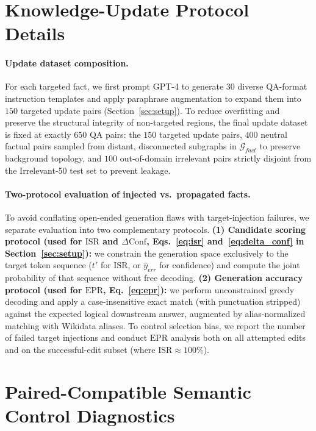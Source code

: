 \section{Knowledge-Update Protocol Details}
\label{app:update_protocol}

\paragraph{Update dataset composition.}
For each targeted fact, we first prompt GPT-4 to generate $30$ diverse QA-format instruction templates and apply paraphrase augmentation to expand them into $150$ targeted update pairs (Section~\ref{sec:setup}). To reduce overfitting and preserve the structural integrity of non-targeted regions, the final update dataset is fixed at exactly $650$ QA pairs: the $150$ targeted update pairs, $400$ neutral factual pairs sampled from distant, disconnected subgraphs in $\mathcal{G}_{fact}$ to preserve background topology, and $100$ out-of-domain irrelevant pairs strictly disjoint from the Irrelevant-50 test set to prevent leakage.

\paragraph{Two-protocol evaluation of injected vs.\ propagated facts.}
To avoid conflating open-ended generation flaws with target-injection failures, we separate evaluation into two complementary protocols. \textbf{(1) Candidate scoring protocol (used for $\mathrm{ISR}$ and $\Delta\mathrm{Conf}$, Eqs.~\ref{eq:isr} and~\ref{eq:delta_conf} in Section~\ref{sec:setup}):} we constrain the generation space exclusively to the target token sequence ($t'$ for $\mathrm{ISR}$, or $\hat{y}_{err}$ for confidence) and compute the joint probability of that sequence without free decoding. \textbf{(2) Generation accuracy protocol (used for $\mathrm{EPR}$, Eq.~\ref{eq:epr}):} we perform unconstrained greedy decoding and apply a case-insensitive exact match (with punctuation stripped) against the expected logical downstream answer, augmented by alias-normalized matching with Wikidata aliases. To control selection bias, we report the number of failed target injections and conduct $\mathrm{EPR}$ analysis both on all attempted edits and on the successful-edit subset (where $\mathrm{ISR} \approx 100\%$).

\section{Paired-Compatible Semantic Control Diagnostics}
\label{app:semantic_diagnostics}

